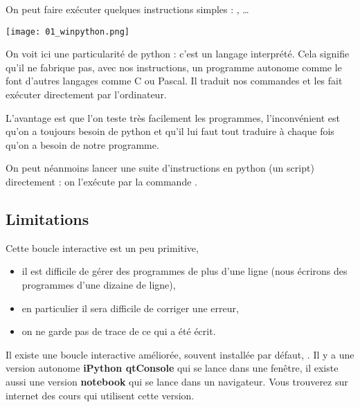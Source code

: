 On peut faire exécuter quelques instructions simples :  , \dots
\begin{center}
\texttt{[image: 01\_winpython.png]} 
\end{center}
On voit ici une particularité de python : c'est un langage interprété.
Cela signifie qu'il ne fabrique pas, avec nos instructions, un programme autonome comme le font d'autres langages comme C ou Pascal. Il traduit nos commandes et les fait exécuter directement par l'ordinateur.

L'avantage est que l'on teste très facilement les programmes, l'inconvénient est qu'on a toujours besoin de python et qu'il lui faut tout traduire à chaque fois qu'on a besoin de notre programme.

On peut néanmoins lancer une suite d'instructions en python (un script) directement : on l'exécute par la commande .
\subsection{Limitations}
Cette boucle interactive est un peu primitive, 

\begin{itemize}
\item il est difficile de gérer des programmes de plus d'une ligne (nous écrirons des programmes d'une dizaine de ligne),
\item en particulier il sera difficile de corriger une erreur,
\item on ne garde pas de trace de ce qui a été écrit.
\end{itemize}

Il existe une boucle interactive améliorée, souvent installée par défaut, . Il y a une version autonome {\bf iPython qtConsole} qui se lance dans une fenêtre, il existe aussi une version {\bf notebook} qui se lance dans un navigateur. 
%
Vous trouverez sur internet des cours qui utilisent cette version.


